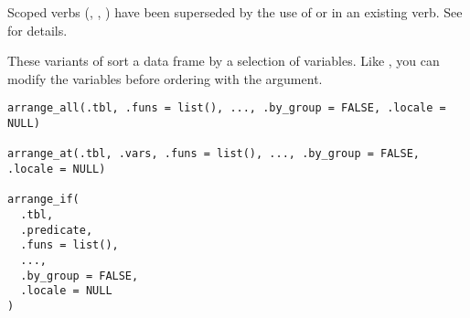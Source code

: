 \documentclass[a4paper]{book}
\begin{document}
%
\begin{Description}
\strong{[Superseded]}

Scoped verbs (, , ) have been superseded by the use of
 or  in an existing verb. See  for
details.

These  variants of  sort a data frame by a
selection of variables. Like , you can modify the
variables before ordering with the  argument.
\end{Description}
%
\begin{Usage}
\begin{verbatim}
arrange_all(.tbl, .funs = list(), ..., .by_group = FALSE, .locale = NULL)

arrange_at(.tbl, .vars, .funs = list(), ..., .by_group = FALSE, .locale = NULL)

arrange_if(
  .tbl,
  .predicate,
  .funs = list(),
  ...,
  .by_group = FALSE,
  .locale = NULL
)
\end{verbatim}
\end{Usage}
%
\end{document}

